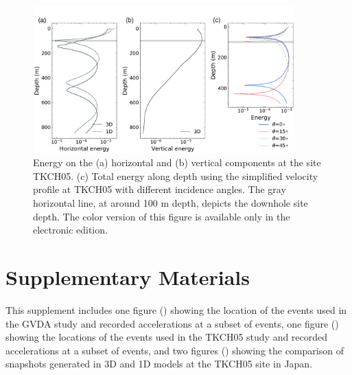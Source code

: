 {\clearpage
\begin{figure}[!ht]
  \centering
  \includegraphics[width=0.9\textwidth]{figures/figure_etf_11.pdf}
  \caption{Energy on the (a) horizontal and (b) vertical components at the site TKCH05. (c) Total energy along depth using the simplified velocity profile at TKCH05 with different incidence angles. The gray horizontal line, at around 100 m depth, depicts the downhole site depth. The color version of this figure is available only in the electronic edition.}
  \label{fig:etf-11}
\end{figure}


\setcounter{table}{0}
\setcounter{figure}{0}
\renewcommand{\thetable}{S\arabic{chapter}.\arabic{table}}
\renewcommand{\thefigure}{S\arabic{chapter}.\arabic{figure}}
\newpage
\section*{Supplementary Materials}

This supplement includes one figure () showing the location of the events used in the GVDA study and recorded accelerations at a subset of events, one figure () showing the locations of the events used in the TKCH05 study and recorded accelerations at a subset of events, and two figures () showing the comparison of snapshots generated in 3D and 1D models at the TKCH05 site in Japan.

}

